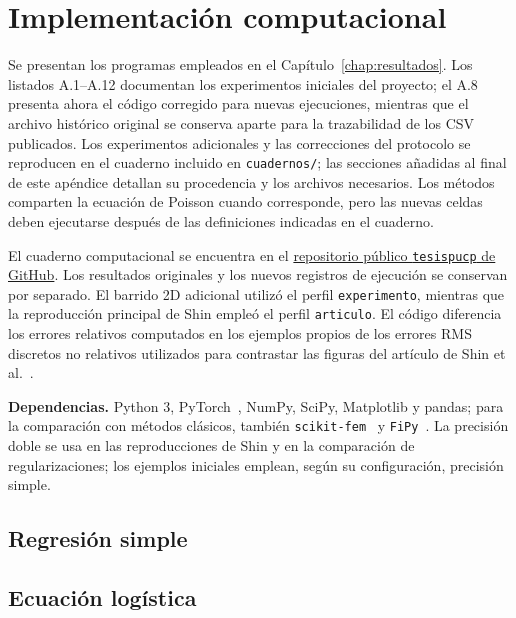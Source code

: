 \chapter{Implementación computacional}
\label{app:codigo}
\singlespacing
\lstset{basicstyle=\ttfamily\scriptsize,breaklines=true,numbersep=4pt,frame=none}

Se presentan los programas empleados en el Capítulo~\ref{chap:resultados}. Los listados A.1--A.12 documentan los experimentos iniciales del proyecto; el A.8 presenta ahora el código corregido para nuevas ejecuciones, mientras que el archivo histórico original se conserva aparte para la trazabilidad de los CSV publicados. Los experimentos adicionales y las correcciones del protocolo se reproducen en el cuaderno incluido en \texttt{cuadernos/}; las secciones añadidas al final de este apéndice detallan su procedencia y los archivos necesarios. Los métodos comparten la ecuación de Poisson cuando corresponde, pero las nuevas celdas deben ejecutarse después de las definiciones indicadas en el cuaderno.

El cuaderno computacional se encuentra en el
\href{https://github.com/MichaelMobius/tesispucp}{repositorio público \texttt{tesispucp} de GitHub}.
Los resultados originales y los nuevos registros de ejecución se conservan por separado. El barrido 2D adicional utilizó el perfil \texttt{experimento}, mientras que la reproducción principal de Shin empleó el perfil \texttt{articulo}. El código diferencia los errores relativos
computados en los ejemplos propios de los errores RMS discretos no relativos
utilizados para contrastar las figuras del artículo de
Shin et al.~\cite{shin2020convergence}.

\noindent\textbf{Dependencias.} Python 3, PyTorch~\cite{paszke2019pytorch}, NumPy, SciPy, Matplotlib y pandas;
para la comparación con métodos clásicos, también \texttt{scikit-fem}~\cite{gustafsson2020scikitfem} y
\texttt{FiPy}~\cite{guyer2009fipy}. La precisión doble se usa en las reproducciones de Shin y
en la comparación de regularizaciones; los ejemplos iniciales emplean,
según su configuración, precisión simple.

\section{Regresión simple}
\label{app:experimento1}


\section{Ecuación logística}
\label{app:experimento2}



